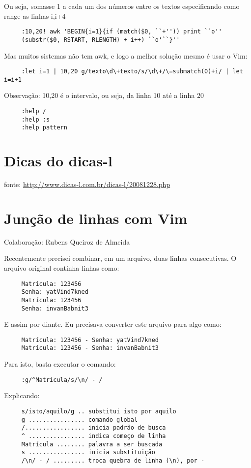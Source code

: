  Ou seja, somasse 1 a cada um dos números entre os textos
 especificando como range as linhas i,i+4

\begin{verbatim}
     :10,20! awk 'BEGIN{i=1}{if (match($0, ``+'')) print ``o''
     (substr($0, RSTART, RLENGTH) + i++) ``o'``}''
\end{verbatim}

 Mas muitos sistemas não tem awk, e logo a melhor solução mesmo é usar o Vim:

\begin{verbatim}
     :let i=1 | 10,20 g/texto\d\+texto/s/\d\+/\=submatch(0)+i/ | let i=i+1
\end{verbatim}

Observação: 10,20 é o intervalo, ou seja, da linha 10 até a linha 20

\begin{verbatim}
     :help /
     :help :s
     :help pattern
\end{verbatim}

\section{Dicas do dicas-l}

fonte: \url{http://www.dicas-l.com.br/dicas-l/20081228.php}

\section{Junção de linhas com Vim}
\label{Junção de linhas com Vim}
Colaboração: Rubens Queiroz de Almeida

Recentemente precisei combinar, em um arquivo, duas linhas
consecutivas. O arquivo original continha linhas como:

\begin{verbatim}
     Matrícula: 123456
     Senha: yatVind7kned
     Matrícula: 123456
     Senha: invanBabnit3
\end{verbatim}

E assim por diante. Eu precisava converter este arquivo para algo como:

\begin{verbatim}
     Matrícula: 123456 - Senha: yatVind7kned
     Matrícula: 123456 - Senha: invanBabnit3
\end{verbatim}

Para isto, basta executar o comando:

\begin{verbatim}
     :g/^Matrícula/s/\n/ - /
\end{verbatim}

Explicando:

\begin{verbatim}
     s/isto/aquilo/g .. substitui isto por aquilo
     g ................ comando global
     /................. inicia padrão de busca
     ^ ................ indica começo de linha
     Matrícula ........ palavra a ser buscada
     s ................ inicia substituição
     /\n/ - / ......... troca quebra de linha (\n), por -
\end{verbatim}
